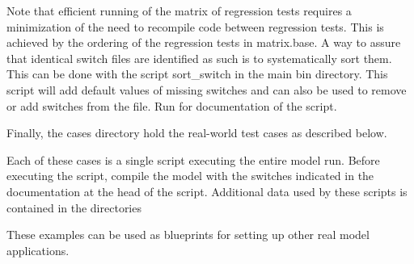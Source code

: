 \begin{flist}
\end{flist}

\noindent 
Note that efficient running of the matrix of regression tests requires a
minimization of the need to recompile code between regression tests. This is
achieved by the ordering of the regression tests in {\file matrix.base}. A way
to assure that identical switch files are identified as such is to
systematically sort them. This can be done with the script {\file
sort\_switch} in the main {\file bin} directory. This script will add default
values of missing switches and can also be used to remove or add switches from
the file. Run  for documentation of the script.

\vspace{\baselineskip} \noindent 
Finally, the {\file cases} directory hold the real-world test cases as
described below.

\begin{flist}
\end{flist}

\noindent 
Each of these cases is a single script executing the entire model run. Before
executing the script, compile the model with the switches indicated in the
documentation at the head of the script. Additional data used by these scripts
is contained in the directories

\begin{flist}
\end{flist}

\noindent 
These examples can be used as blueprints for setting up other real model
applications.


